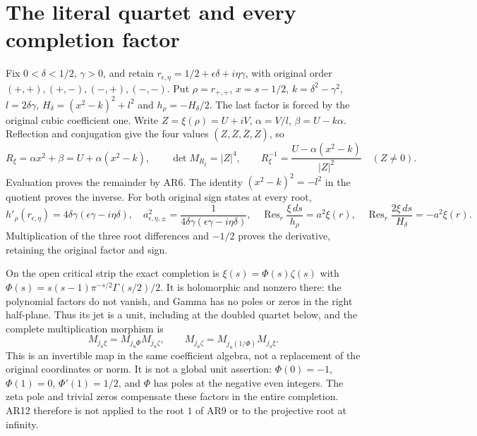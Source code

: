 \documentclass[11pt]{article}
\newcommand{\Res}{\operatorname{Res}}
\begin{document}
\section{The literal quartet and every completion factor}
Fix $0<\delta<1/2$, $\gamma>0$, and retain
$r_{\epsilon,\eta}=1/2+\epsilon\delta+i\eta\gamma$,
with original order $(+,+),(+,-),(-,+),(-,-)$.
Put $\rho=r_{+,+}$, $x=s-1/2$, $k=\delta^2-\gamma^2$,
$l=2\delta\gamma$, $H_\delta=(x^2-k)^2+l^2$ and
$h_\rho=-H_\delta/2$. The last factor is forced by the
original cubic coefficient one. Write
$Z=\xi(\rho)=U+iV$, $\alpha=V/l$, $\beta=U-k\alpha$.
Reflection and conjugation give the four values
$(Z,\overline Z,\overline Z,Z)$, so
\begin{equation}
R_\xi=\alpha x^2+\beta=U+\alpha(x^2-k),\qquad
\det M_{R_\xi}=|Z|^4,\qquad
R_\xi^{-1}=\frac{U-\alpha(x^2-k)}{|Z|^2}\quad(Z\ne0).
\tag{AR10}
\end{equation}
Evaluation proves the remainder by AR6. The identity
$(x^2-k)^2=-l^2$ in the quotient proves the inverse.
For both original sign states at every root,
\begin{equation}
h'_\rho(r_{\epsilon,\eta})
=4\delta\gamma(\epsilon\gamma-i\eta\delta),\quad
a_{\epsilon,\eta,\pm}^2
=\frac{1}{4\delta\gamma(\epsilon\gamma-i\eta\delta)},\quad
\Res_r\frac{\xi\,ds}{h_\rho}=a^2\xi(r),\quad
\Res_r\frac{2\xi\,ds}{H_\delta}=-a^2\xi(r).
\tag{AR11}
\end{equation}
Multiplication of the three root differences and $-1/2$
proves the derivative, retaining the original factor and sign.

On the open critical strip the exact completion is
$\xi(s)=\Phi(s)\zeta(s)$ with
$\Phi(s)=s(s-1)\pi^{-s/2}\Gamma(s/2)/2$.
It is holomorphic and nonzero there: the polynomial factors
do not vanish, and Gamma has no poles or zeros in the right
half-plane. Thus its jet is a unit, including at the doubled
quartet below, and the complete multiplication morphism is
\begin{equation}
M_{j_u\xi}=M_{j_u\Phi}M_{j_u\zeta},\qquad
M_{j_u\zeta}=M_{j_u(1/\Phi)}M_{j_u\xi}.
\tag{AR12}
\end{equation}
This is an invertible map in the same coefficient algebra,
not a replacement of the original coordinates or norm.
It is not a global unit assertion: $\Phi(0)=-1$,
$\Phi(1)=0$, $\Phi'(1)=1/2$, and $\Phi$ has poles at the
negative even integers. The zeta pole and trivial zeros
compensate these factors in the entire completion.
AR12 therefore is not applied to the root $1$ of AR9 or to
the projective root at infinity.
\end{document}
